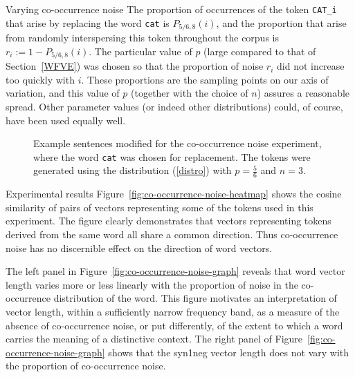 \documentclass{article} %
\newcommand{\word}[1]{\texttt{#1}}
\begin{document}
\begin{section}{Varying co-occurrence noise}
The proportion of occurrences of the token \word{CAT\_i} that arise by
replacing the word \word{cat} is $P_{5/6, 8}(i)$, and the proportion
that arise from randomly interspersing this token throughout the corpus
is $r_i := 1 - P_{5/6, 8}(i)$.  The particular value of $p$ (large
compared to that of Section~\ref{WFVE}) was chosen so that the
proportion of noise $r_i$ did not increase too quickly with $i$.  These
proportions are the sampling points on our axis of variation, and this
value of $p$ (together with the choice of $n$) assures a reasonable
spread.  Other parameter values (or indeed other distributions) could,
of course, have been used equally well.

\begin{table}
	
	\label{fig:co-occurrence-noise-counts}
	\caption{Words chosen for the co-occurrence noise experiment, along with the occurrence counts in the unmodified corpus. }
	\label{cooccurrence-noise-words}
\end{table}

\begin{figure}
	\begin{mdframed}
	
	\end{mdframed}
	\caption{Example sentences modified for the co-occurrence noise
          experiment, where the word \word{cat} was chosen for
          replacement.  The tokens were generated using the distribution
          (\ref{distro}) with $p = \tfrac{5}{6}$ and $n=3$.}
	\label{fig:co-occurrence-noise-experiment-text}
\end{figure}

\begin{subsection}{Experimental results}
Figure~\ref{fig:co-occurrence-noise-heatmap} shows the cosine similarity
of pairs of vectors representing some of the tokens used in this
experiment.  The figure clearly demonstrates that vectors representing
tokens derived from the same word all share a common direction.  Thus
co-occurrence noise has no discernible effect on the direction of word
vectors.

The left panel in Figure~\ref{fig:co-occurrence-noise-graph} reveals
that word vector length varies more or less linearly with the proportion
of noise in the co-occurrence distribution of the word.  This figure motivates an
interpretation of vector length, within a sufficiently narrow frequency
band, as a measure of the absence of co-occurrence noise, or put
differently, of the extent to which a word carries the meaning of a
distinctive context.
The right panel of Figure~\ref{fig:co-occurrence-noise-graph} shows that the
syn1neg vector length does not vary with the proportion of co-occurrence noise.


\end{subsection}
\end{section}
\end{document}
